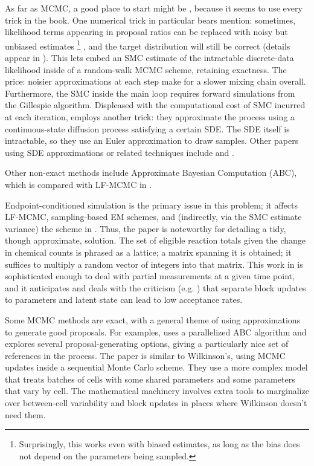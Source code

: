 \documentclass{article}
\begin{document}
As far as MCMC, a good place to start might be \cite{golightly2011bayesian}, because it seems to use every trick in the book. One numerical trick in particular bears mention: sometimes, likelihood terms appearing in proposal ratios can be replaced with noisy but unbiased estimates 
%
\footnote{Surprisingly, this works even with biased estimates, as long as the bias does not depend on the parameters being sampled.}
%
, and the target distribution will still be correct (details appear in \cite{andrieu2010particle}). This lets \cite{golightly2011bayesian} embed an SMC estimate of the intractable discrete-data likelihood inside of a random-walk MCMC scheme, retaining exactness. The price: noisier approximations at each step make for a slower mixing chain overall. Furthermore, the SMC inside the main loop requires forward simulations from the Gillespie algorithm. Displeased with the computational cost of SMC incurred at each iteration, \cite{golightly2011bayesian} employs another trick: they approximate the process using a continuous-state diffusion process satisfying a certain SDE. The SDE itself is intractable, so they use an Euler approximation to draw samples. Other papers using SDE approximations or related techniques include \cite{golightly2005bayesian} and
 \cite{fearnhead2014inference}.

Other non-exact methods include Approximate Bayesian Computation (ABC), which is compared with LF-MCMC in \cite{owen2014ABC_LF-MCMCcomparison}. 

Endpoint-conditioned simulation is the primary issue in this problem; it affects LF-MCMC, sampling-based EM schemes, and (indirectly, via the SMC estimate variance) the scheme in  \cite{golightly2011bayesian}. Thus, the paper \cite{amrein2012rate} is noteworthy for detailing a tidy, though approximate, solution. The set of eligible reaction totals given the change in chemical counts is phrased as a lattice; a matrix spanning it is obtained; it suffices to multiply a random vector of integers into that matrix. This work in \cite{amrein2012rate} is sophisticated enough to deal with partial measurements at a given time point, and it anticipates and deals with the criticism (e.g. \cite{golightly2011bayesian}) that separate block updates to parameters and latent state can lead to low acceptance rates.

Some MCMC methods are exact, with a general theme of using approximations to generate good proposals. For examples, \cite{owen2014scalable} uses a parallelized ABC algorithm and \cite{golightly2014smc_b_subtilis} explores several proposal-generating options, giving a particularly nice set of references in the process. %
The paper \cite{zechner2014scalable} is similar to Wilkinson's, using MCMC updates inside a sequential Monte Carlo scheme. They use a more complex model that treats batches of cells with some shared parameters and some parameters that vary by cell. The mathematical machinery involves extra tools to marginalize over between-cell variability and block updates in places where Wilkinson doesn't need them.
\end{document}
